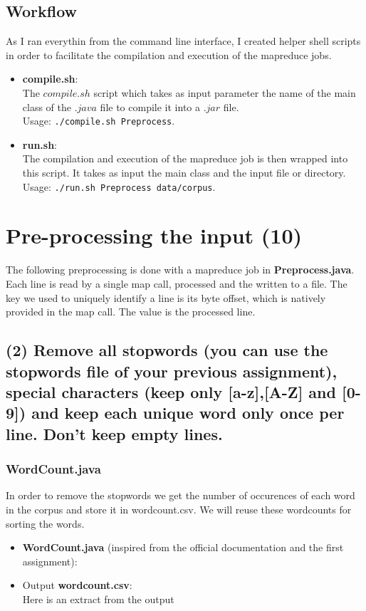 \documentclass[a4paper,10pt]{article}
\begin{document}
\subsection{Workflow}
As I ran everythin from the command line interface, I created helper shell scripts
in order to facilitate the compilation and execution of the mapreduce jobs.
\begin{itemize}

\item \textbf{compile.sh}:\\
The $compile.sh$ script which takes as input parameter the name of the main
class of the $.java$ file to compile it into a $.jar$ file.
\\Usage: \lstinline{./compile.sh Preprocess}.

\item \textbf{run.sh}:\\
The compilation and execution of the mapreduce job is then wrapped into this script.
It takes as input the main class and the input file or directory.
\\Usage: \lstinline{./run.sh Preprocess data/corpus}.



\end{itemize}

\section{Pre-processing the input (10)}

The following preprocessing is done with a mapreduce job in \textbf{Preprocess.java}.
Each line is read by a single map call, processed and the written to a file.
The key we used to uniquely identify a line is its byte offset, which is natively
provided in the map call.
The value is the processed line.

\subsection{(2) Remove all stopwords (you can use the stopwords file of your previous
assignment), special characters (keep only [a-z],[A-Z] and [0-9]) and keep each unique
word only once per line. Don’t keep empty lines.}
\subsubsection{WordCount.java}
In order to remove the stopwords we get the number of occurences of each word in
the corpus and store it in wordcount.csv.
We will reuse these wordcounts for sorting the words.
\begin{itemize}
  \item \textbf{WordCount.java} (inspired from the official documentation and the first assignment):
  
  \item Output \textbf{wordcount.csv}:\\
  Here is an extract from the output
  
\end{itemize}
\end{document}
